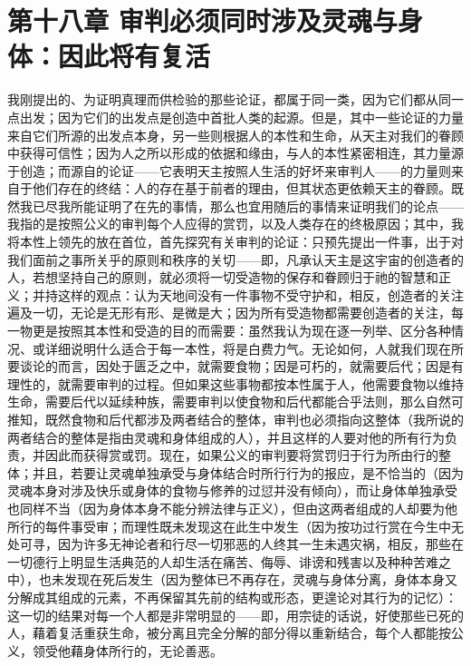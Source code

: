
\section{第十八章 审判必须同时涉及灵魂与身体：因此将有复活}

我刚提出的、为证明真理而供检验的那些论证，都属于同一类，因为它们都从同一点出发；因为它们的出发点是创造中首批人类的起源。但是，其中一些论证的力量来自它们所源的出发点本身，另一些则根据人的本性和生命，从天主对我们的眷顾中获得可信性；因为人之所以形成的依据和缘由，与人的本性紧密相连，其力量源于创造；而源自的论证——它表明天主按照人生活的好坏来审判人——的力量则来自于他们存在的终结：人的存在基于前者的理由，但其状态更依赖天主的眷顾。既然我已尽我所能证明了在先的事情，那么也宜用随后的事情来证明我们的论点——我指的是按照公义的审判每个人应得的赏罚，以及人类存在的终极原因；其中，我将本性上领先的放在首位，首先探究有关审判的论证：只预先提出一件事，出于对我们面前之事所关乎的原则和秩序的关切——即，凡承认天主是这宇宙的创造者的人，若想坚持自己的原则，就必须将一切受造物的保存和眷顾归于祂的智慧和正义；并持这样的观点：认为天地间没有一件事物不受守护和，相反，创造者的关注遍及一切，无论是无形有形、是微是大；因为所有受造物都需要创造者的关注，每一物更是按照其本性和受造的目的而需要：虽然我认为现在逐一列举、区分各种情况、或详细说明什么适合于每一本性，将是白费力气。无论如何，人就我们现在所要谈论的而言，因处于匮乏之中，就需要食物；因是可朽的，就需要后代；因是有理性的，就需要审判的过程。但如果这些事物都按本性属于人，他需要食物以维持生命，需要后代以延续种族，需要审判以使食物和后代都能合乎法则，那么自然可推知，既然食物和后代都涉及两者结合的整体，审判也必须指向这整体（我所说的两者结合的整体是指由灵魂和身体组成的人），并且这样的人要对他的所有行为负责，并因此而获得赏或罚。现在，如果公义的审判要将赏罚归于行为所由行的整体；并且，若要让灵魂单独承受与身体结合时所行行为的报应，是不恰当的（因为灵魂本身对涉及快乐或身体的食物与修养的过愆并没有倾向），而让身体单独承受也同样不当（因为身体本身不能分辨法律与正义），但由这两者组成的人却要为他所行的每件事受审；而理性既未发现这在此生中发生（因为按功过行赏在今生中无处可寻，因为许多无神论者和行尽一切邪恶的人终其一生未遇灾祸，相反，那些在一切德行上明显生活典范的人却生活在痛苦、侮辱、诽谤和残害以及种种苦难之中），也未发现在死后发生（因为整体已不再存在，灵魂与身体分离，身体本身又分解成其组成的元素，不再保留其先前的结构或形态，更遑论对其行为的记忆）：这一切的结果对每一个人都是非常明显的——即，用宗徒的话说，好使那些已死的人，藉着复活重获生命，被分离且完全分解的部分得以重新结合，每个人都能按公义，领受他藉身体所行的，无论善恶。\par

